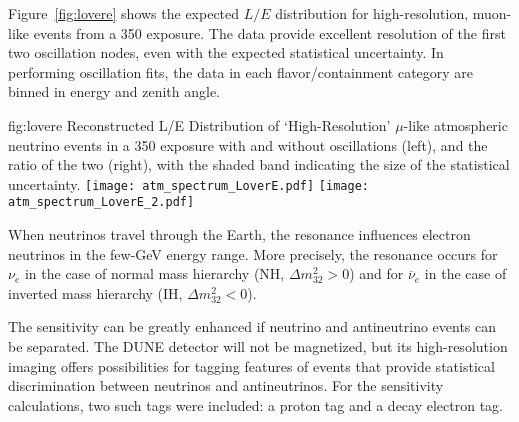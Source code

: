 
Figure~\ref{fig:lovere} shows the expected $L/E$ distribution for high-resolution, muon-like 
events from a \SI{350}{\ktyr} exposure. The data provide excellent resolution of the 
first two oscillation nodes, even with the expected statistical uncertainty.
In performing oscillation fits, the data in each flavor/containment category are 
binned in energy and zenith angle.

\begin{dunefigure}
{fig:lovere}
{Reconstructed L/E Distribution of `High-Resolution'
$\mu$-like atmospheric neutrino events in a \SI{350}{\ktyr} exposure with and
without oscillations (left), and the ratio of the two (right), with the
shaded band indicating the size of the statistical uncertainty.}
\texttt{[image: atm\_spectrum\_LoverE.pdf]}
\texttt{[image: atm\_spectrum\_LoverE\_2.pdf]}
\end{dunefigure}

When neutrinos travel through the Earth, the  resonance influences 
electron neutrinos in the few-GeV energy range. More precisely, the resonance 
occurs for $\nu_e$ in the case of normal mass hierarchy (NH, $\Delta m^2_{32} > 0$) and for 
$\overline{\nu}_e$ in the case of inverted mass hierarchy (IH, $\Delta m^2_{32} < 0$).

The  sensitivity can be greatly enhanced if neutrino and antineutrino events can be 
separated. The DUNE detector will not be magnetized, but its high-resolution 
imaging offers possibilities for tagging features of events that provide statistical 
discrimination between neutrinos and antineutrinos. For the sensitivity calculations, 
two such tags were included: a proton tag and a decay electron tag. 

